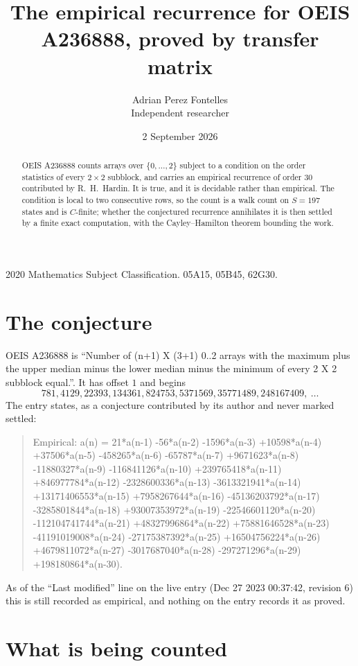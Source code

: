 \documentclass[11pt,a4paper]{article}
\title{The empirical recurrence for OEIS A236888, proved by transfer matrix}
\author{Adrian Perez Fontelles\\ \small Independent researcher}
\date{2 September 2026}
\theoremstyle{plain}
\theoremstyle{definition}
\begin{document}
\maketitle

\begin{abstract}
OEIS A236888 counts arrays over $\{0,\dots,2\}$ subject to a condition on the order
statistics of every $2\times2$ subblock, and carries an empirical recurrence of order
$30$ contributed by R.~H.~Hardin. It is true, and it is decidable rather than empirical.
The condition is local to two consecutive rows, so the count is a walk count on $S=197$
states and is $C$-finite; whether the conjectured recurrence annihilates it is then settled by
a finite exact computation, with the Cayley--Hamilton theorem bounding the work.
\end{abstract}

\noindent\small 2020 Mathematics Subject Classification. 05A15, 05B45, 62G30.\normalsize

\section{The conjecture}

OEIS A236888 is ``Number of (n+1) X (3+1) 0..2 arrays with the maximum plus the upper median minus the lower median minus the minimum of every 2 X 2 subblock equal.''. It has offset $1$ and begins
\[
781, 4129, 22393, 134361, 824753, 5371569, 35771489, 248167409,\ \dots
\]
The entry states, as a conjecture contributed by its author and never marked settled:
\begin{quote}
Empirical: a(n) = 21*a(n-1) -56*a(n-2) -1596*a(n-3) +10598*a(n-4) +37506*a(n-5) -458265*a(n-6) -65787*a(n-7) +9671623*a(n-8) -11880327*a(n-9) -116841126*a(n-10) +239765418*a(n-11) +846977784*a(n-12) -2328600336*a(n-13) -3613321941*a(n-14) +13171406553*a(n-15) +7958267644*a(n-16) -45136203792*a(n-17) -3285801844*a(n-18) +93007353972*a(n-19) -22546601120*a(n-20) -112104741744*a(n-21) +48327996864*a(n-22) +75881646528*a(n-23) -41191019008*a(n-24) -27175387392*a(n-25) +16504756224*a(n-26) +4679811072*a(n-27) -3017687040*a(n-28) -297271296*a(n-29) +198180864*a(n-30).
\end{quote}
As of the ``Last modified'' line on the live entry (Dec 27 2023 00:37:42, revision 6) this is still
recorded as empirical, and nothing on the entry records it as proved.

\section{What is being counted}
\end{document}
